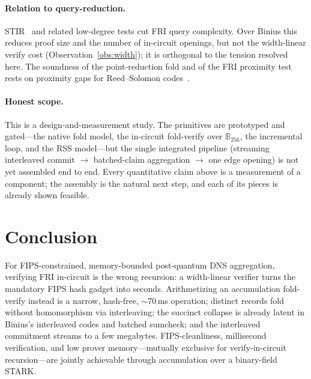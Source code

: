 \documentclass[11pt]{article}
\newcommand{\bt}{\mathbb{B}}
\newcommand{\field}[1]{\bt_{#1}}
\begin{document}
\paragraph{Relation to query-reduction.} STIR~\cite{stir} and related low-degree
tests cut FRI query complexity. Over Binius this reduces proof size and the
number of in-circuit openings, but not the width-linear verify cost
(Observation~\ref{obs:width}); it is orthogonal to the tension resolved here. The
soundness of the point-reduction fold and of the FRI proximity test rests on
proximity gaps for Reed--Solomon codes~\cite{proximitygaps}.

\paragraph{Honest scope.} This is a design-and-measurement study. The primitives
are prototyped and gated---the native fold model, the in-circuit fold-verify over
$\field{256}$, the incremental loop, and the RSS model---but the single
integrated pipeline (streaming interleaved commit $\to$ batched-claim aggregation
$\to$ one edge opening) is not yet assembled end to end. Every quantitative claim
above is a measurement of a component; the assembly is the natural next step, and
each of its pieces is already shown feasible.

\section{Conclusion}

For FIPS-constrained, memory-bounded post-quantum DNS aggregation, verifying FRI
in-circuit is the wrong recursion: a width-linear verifier turns the mandatory
FIPS hash gadget into seconds. Arithmetizing an accumulation fold-verify instead
is a narrow, hash-free, $\sim70$\,ms operation; distinct records fold without
homomorphism via interleaving; the succinct collapse is already latent in
Binius's interleaved codes and batched sumcheck; and the interleaved commitment
streams to a few megabytes. FIPS-cleanliness, millisecond verification, and low
prover memory---mutually exclusive for verify-in-circuit recursion---are jointly
achievable through accumulation over a binary-field STARK.



\end{document}
